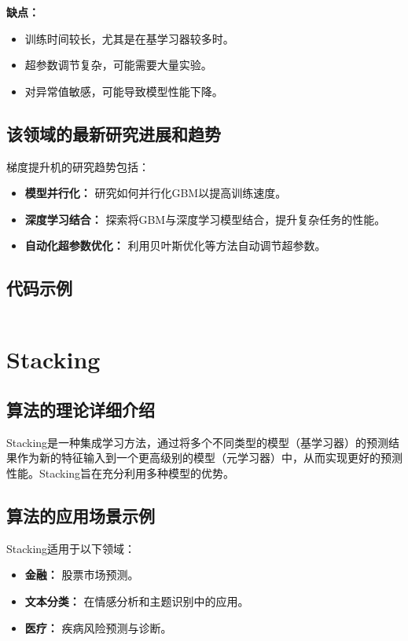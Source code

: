 \textbf{缺点：}
\begin{itemize}
    \item 训练时间较长，尤其是在基学习器较多时。
    \item 超参数调节复杂，可能需要大量实验。
    \item 对异常值敏感，可能导致模型性能下降。
\end{itemize}

\subsection*{该领域的最新研究进展和趋势}
梯度提升机的研究趋势包括：
\begin{itemize}
    \item \textbf{模型并行化：} 研究如何并行化GBM以提高训练速度。
    \item \textbf{深度学习结合：} 探索将GBM与深度学习模型结合，提升复杂任务的性能。
    \item \textbf{自动化超参数优化：} 利用贝叶斯优化等方法自动调节超参数。
\end{itemize}
\subsection*{代码示例}
\begin{lstlisting}

\end{lstlisting}


\section{Stacking}
\subsection*{算法的理论详细介绍}
Stacking是一种集成学习方法，通过将多个不同类型的模型（基学习器）的预测结果作为新的特征输入到一个更高级别的模型（元学习器）中，从而实现更好的预测性能。Stacking旨在充分利用多种模型的优势。

\subsection*{算法的应用场景示例}
Stacking适用于以下领域：
\begin{itemize}
    \item \textbf{金融：} 股票市场预测。
    \item \textbf{文本分类：} 在情感分析和主题识别中的应用。
    \item \textbf{医疗：} 疾病风险预测与诊断。
\end{itemize}

